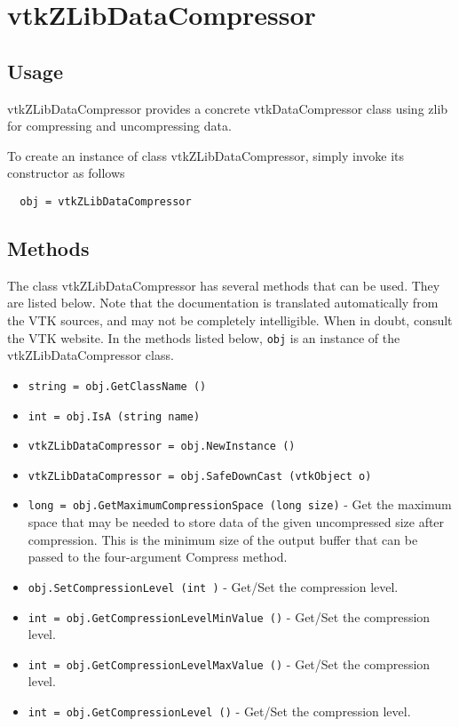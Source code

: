 \section{vtkZLibDataCompressor}

\subsection{Usage}

 vtkZLibDataCompressor provides a concrete vtkDataCompressor class
 using zlib for compressing and uncompressing data.

To create an instance of class vtkZLibDataCompressor, simply
invoke its constructor as follows
\begin{verbatim}
  obj = vtkZLibDataCompressor
\end{verbatim}
\subsection{Methods}

The class vtkZLibDataCompressor has several methods that can be used.
  They are listed below.
Note that the documentation is translated automatically from the VTK sources,
and may not be completely intelligible.  When in doubt, consult the VTK website.
In the methods listed below, \verb|obj| is an instance of the vtkZLibDataCompressor class.
\begin{itemize}
\item  \verb|string = obj.GetClassName ()|

\item  \verb|int = obj.IsA (string name)|

\item  \verb|vtkZLibDataCompressor = obj.NewInstance ()|

\item  \verb|vtkZLibDataCompressor = obj.SafeDownCast (vtkObject o)|

\item  \verb|long = obj.GetMaximumCompressionSpace (long size)| -  Get the maximum space that may be needed to store data of the
 given uncompressed size after compression.  This is the minimum
 size of the output buffer that can be passed to the four-argument
 Compress method.

\item  \verb|obj.SetCompressionLevel (int )| -  Get/Set the compression level.

\item  \verb|int = obj.GetCompressionLevelMinValue ()| -  Get/Set the compression level.

\item  \verb|int = obj.GetCompressionLevelMaxValue ()| -  Get/Set the compression level.

\item  \verb|int = obj.GetCompressionLevel ()| -  Get/Set the compression level.

\end{itemize}
